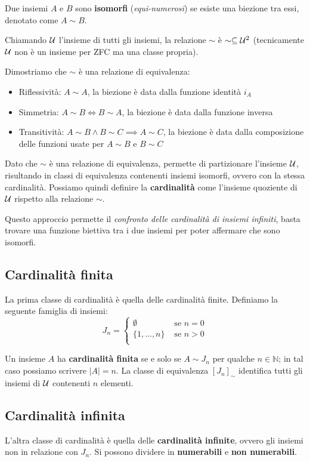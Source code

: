 Due insiemi $A$ e $B$ sono \textbf{isomorfi} (\textit{equi-numerosi}) se esiste una biezione tra essi, denotato come $A \sim B$. 

Chiamando $\mathcal{U}$ l'insieme di tutti gli insiemi, la relazione $\sim$ è $\sim \subseteq \mathcal{U}^2$ (tecnicamente $\mathcal{U}$ non è un insieme per ZFC ma una classe propria).

Dimostriamo che $\sim$ è una relazione di equivalenza: 
\begin{itemize}
	\item Riflessività: $A \sim A$, la biezione è data dalla funzione identità $i_A$
	
    \item Simmetria: $A \sim B \Leftrightarrow B \sim A$, la biezione è data dalla funzione inversa
	
    \item Transitività: $A \sim B \wedge B \sim C \implies A \sim C$, la biezione è data dalla composizione delle funzioni usate per $A \sim B$ e $B \sim C$
\end{itemize}

Dato che $\sim$ è una relazione di equivalenza, permette di partizionare l'insieme $\mathcal{U}$, risultando in classi di equivalenza contenenti insiemi isomorfi, ovvero con la stessa cardinalità. Possiamo quindi definire la \textbf{cardinalità} come l'insieme quoziente di $\mathcal{U}$ rispetto alla relazione $\sim$.

Questo approccio permette il \textit{confronto delle cardinalità di insiemi infiniti}, basta trovare una funzione biettiva tra i due insiemi per poter affermare che sono isomorfi.

\subsection{Cardinalità finita}
La prima classe di cardinalità è quella delle cardinalità finite. Definiamo la seguente famiglia di insiemi:
$$ J_n = \begin{cases}
	\emptyset & \text{ se } n = 0 \\
	\{1, \dots , n\} & \text{ se } n > 0 \\
\end{cases}$$

Un insieme $A$ ha \textbf{cardinalità finita} se e solo se $A \sim J_n$ per qualche $n \in \mathbb{N}$; in tal caso possiamo scrivere $|A| = n$. La classe di equivalenza $[J_n]_{\sim}$ identifica tutti gli insiemi di $\mathcal{U}$ contenenti $n$ elementi.

\subsection{Cardinalità infinita}
L'altra classe di cardinalità è quella delle \textbf{cardinalità infinite}, ovvero gli insiemi non in relazione con $J_n$. Si possono dividere in \textbf{numerabili} e \textbf{non numerabili}.

